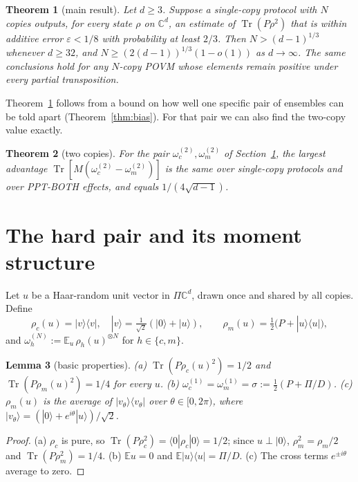 \documentclass[pdflatex,sn-mathphys-num]{sn-jnl}%
\theoremstyle{thmstyleone}
\newtheorem{theorem}{Theorem}
\newtheorem{lemma}[theorem]{Lemma}
\theoremstyle{thmstylethree}
\theoremstyle{thmstyletwo}
\newcommand{\Tr}{\operatorname{Tr}}
\newcommand{\E}{\mathbb{E}}
\newcommand{\ket}[1]{|#1\rangle}
\newcommand{\bra}[1]{\langle #1|}
\newcommand{\C}{\mathbb{C}}
\begin{document}
\begin{theorem}[main result]\label{thm:main}
Let $d\ge3$. Suppose a single-copy protocol with $N$ copies outputs, for every state $\rho$ on $\C^d$, an estimate of
$\Tr(P\rho^2)$ that is within additive error $\varepsilon<1/8$ with probability at least $2/3$. Then $N>(d-1)^{1/3}$
whenever $d\ge32$, and $N\ge(2(d-1))^{1/3}(1-o(1))$ as $d\to\infty$. The same conclusions hold for any $N$-copy POVM
whose elements remain positive under every partial transposition.
\end{theorem}

Theorem~\ref{thm:main} follows from a bound on how well one specific pair of ensembles can be told apart
(Theorem~\ref{thm:bias}). For that pair we can also find the two-copy value exactly.

\begin{theorem}[two copies]\label{thm:two}
For the pair $\omega_c^{(2)},\omega_m^{(2)}$ of Section~\ref{sec:pair}, the largest advantage
$\Tr[M(\omega_c^{(2)}-\omega_m^{(2)})]$ is the same over single-copy protocols and over PPT-BOTH effects, and equals
$1/(4\sqrt{d-1})$.
\end{theorem}

\section{The hard pair and its moment structure}\label{sec:pair}

Let $u$ be a Haar-random unit vector in $\Pi\C^d$, drawn once and shared by all copies. Define
\[
\rho_c(u)=\ket v\bra v,\quad \ket v=\tfrac{1}{\sqrt2}(\ket0+\ket u),\qquad \rho_m(u)=\tfrac12\bigl(P+\ket u\bra u\bigr),
\]
and $\omega_h^{(N)}:=\E_u\,\rho_h(u)^{\otimes N}$ for $h\in\{c,m\}$.

\begin{lemma}[basic properties]\label{lem:basic}
(a) $\Tr(P\rho_c(u)^2)=1/2$ and $\Tr(P\rho_m(u)^2)=1/4$ for every $u$. (b) $\omega_c^{(1)}=\omega_m^{(1)}=\sigma:=
\tfrac12(P+\Pi/D)$. (c) $\rho_m(u)$ is the average of $\ket{v_\theta}\bra{v_\theta}$ over $\theta\in[0,2\pi)$, where
$\ket{v_\theta}=(\ket0+e^{i\theta}\ket u)/\sqrt2$.
\end{lemma}
\begin{proof}
(a) $\rho_c$ is pure, so $\Tr(P\rho_c^2)=\bra0\rho_c\ket0=1/2$; since $u\perp\ket0$, $\rho_m^2=\rho_m/2$ and
$\Tr(P\rho_m^2)=1/4$. (b) $\E u=0$ and $\E\ket u\bra u=\Pi/D$. (c) The cross terms $e^{\pm i\theta}$ average to zero.
\end{proof}
\end{document}

